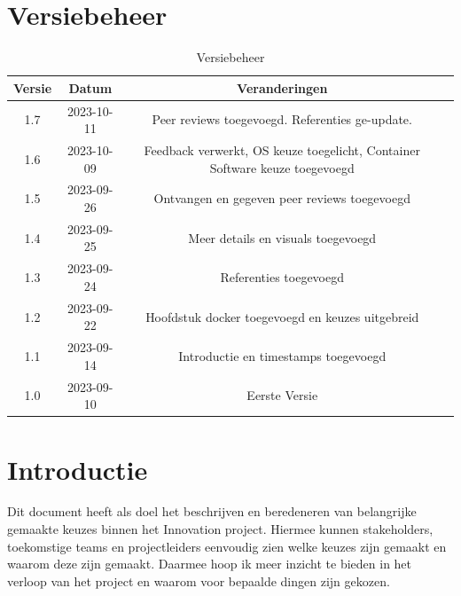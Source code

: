 \documentclass[a4paper]{report}
\newcommand{\latestVersion}{1.7}
\begin{document}
\chapter{Versiebeheer}
\begin{table}[h]
    \centering
    \begin{tabular}{|c|c|c|p{5cm}|}
        \hline
        \textbf{Versie} & \textbf{Datum} & \textbf{Veranderingen}  \\
        \hline
        \latestVersion   & 2023-10-11 & Peer reviews toegevoegd. Referenties ge-update. \\
        \hline
        1.6    & 2023-10-09 & Feedback verwerkt, OS keuze toegelicht, Container Software keuze toegevoegd \\
        \hline
        1.5    & 2023-09-26 & Ontvangen en gegeven peer reviews toegevoegd \\
        \hline
        1.4    & 2023-09-25 & Meer details en visuals toegevoegd \\
        \hline
        1.3    & 2023-09-24 & Referenties toegevoegd \\
        \hline
        1.2    & 2023-09-22 & Hoofdstuk docker toegevoegd en keuzes uitgebreid \\
        \hline
        1.1    & 2023-09-14 & Introductie en timestamps toegevoegd\\
        \hline
        1.0    & 2023-09-10 & Eerste Versie \\
        \hline
    \end{tabular}
    \caption{Versiebeheer}
\end{table}


\chapter{Introductie}
Dit document heeft als doel het beschrijven en beredeneren van belangrijke gemaakte keuzes binnen het Innovation project. 
Hiermee kunnen stakeholders, toekomstige teams en projectleiders eenvoudig zien welke keuzes zijn gemaakt en waarom deze zijn gemaakt.
Daarmee hoop ik meer inzicht te bieden in het verloop van het project en waarom voor bepaalde dingen zijn gekozen. 
\vspace{1.5cm}

\begingroup
\let\clearpage\relax
\end{document}
